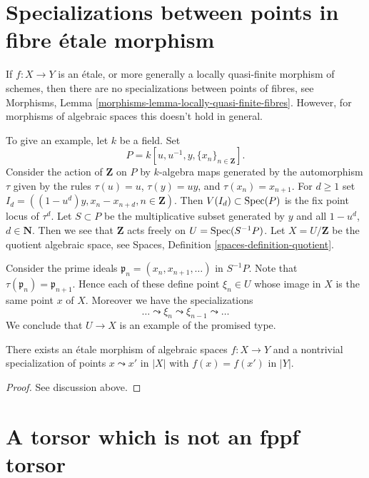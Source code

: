 \section{Specializations between points in fibre \'etale morphism}
\label{section-specializations-fibre-etale}

\noindent
If $f : X \to Y$ is an \'etale, or more generally a locally quasi-finite
morphism of schemes, then there are no specializations between points of
fibres, see
Morphisms, Lemma \ref{morphisms-lemma-locally-quasi-finite-fibres}.
However, for morphisms of algebraic spaces this doesn't hold in general.

\medskip\noindent
To give an example, let $k$ be a field.
Set
$$
P = k[u, u^{-1}, y, \{x_n\}_{n \in \mathbf{Z}}].
$$
Consider the action
of $\mathbf{Z}$ on $P$ by $k$-algebra maps generated by the automorphism
$\tau$ given by the rules $\tau(u) = u$, $\tau(y) = uy$, and
$\tau(x_n) = x_{n + 1}$. For $d \geq 1$ set
$I_d = ((1 - u^d)y, x_n - x_{n + d}, n \in \mathbf{Z})$.
Then $V(I_d) \subset \mathop{\mathrm{Spec}}(P)$ is the fix point locus of $\tau^d$.
Let $S \subset P$ be the multiplicative subset generated by $y$ and
all $1 - u^d$, $d \in \mathbf{N}$. Then we
see that $\mathbf{Z}$ acts freely on $U = \mathop{\mathrm{Spec}}(S^{-1}P)$.
Let $X = U/\mathbf{Z}$ be the quotient algebraic space, see
Spaces, Definition \ref{spaces-definition-quotient}.

\medskip\noindent
Consider the prime ideals $\mathfrak p_n = (x_n, x_{n + 1}, \ldots)$ in
$S^{-1}P$. Note that $\tau(\mathfrak p_n) = \mathfrak p_{n + 1}$.
Hence each of these define point $\xi_n \in U$ whose image in $X$ is
the same point $x$ of $X$. Moreover we have the specializations
$$
\ldots \leadsto \xi_n \leadsto \xi_{n - 1} \leadsto \ldots
$$
We conclude that $U \to X$ is an example of the promised type.

\begin{lemma}
\label{lemma-specializations-fibre-etale}
There exists an \'etale morphism of algebraic spaces $f : X \to Y$
and a nontrivial specialization of points $x \leadsto x'$ in $|X|$ with
$f(x) = f(x')$ in $|Y|$.
\end{lemma}

\begin{proof}
See discussion above.
\end{proof}







\section{A torsor which is not an fppf torsor}
\label{section-torsor-not-fppf}

